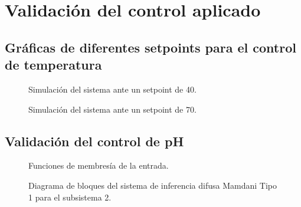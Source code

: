 \documentclass[11pt,tesis,twoside,openright,spanish]{upiiztt}
\begin{document}
\chapter{Validación del control aplicado}
\label{ap:control}

\section*{Gráficas de diferentes setpoints para el control de temperatura}

\begin{figure}[H]
  \centering
  \caption{Simulación del sistema ante un setpoint de 40.}
  \label{fig:sim_sp40}
\end{figure}

\begin{figure}[H]
  \centering
  \caption{Simulación del sistema ante un setpoint de 70.}
  \label{fig:sim_sp70}
\end{figure}

\section*{Validación del control de pH}

\begin{figure}[H]
  \centering
  \caption{Funciones de membresía de la entrada.}
  \label{fig:membresia_entrada}
\end{figure}

\begin{figure}[H]
  \centering
  \caption{Diagrama de bloques del sistema de inferencia difusa Mamdani Tipo 1 para el subsistema 2.}
  \label{fig:mamdani_sub2}
\end{figure}
\end{document}
